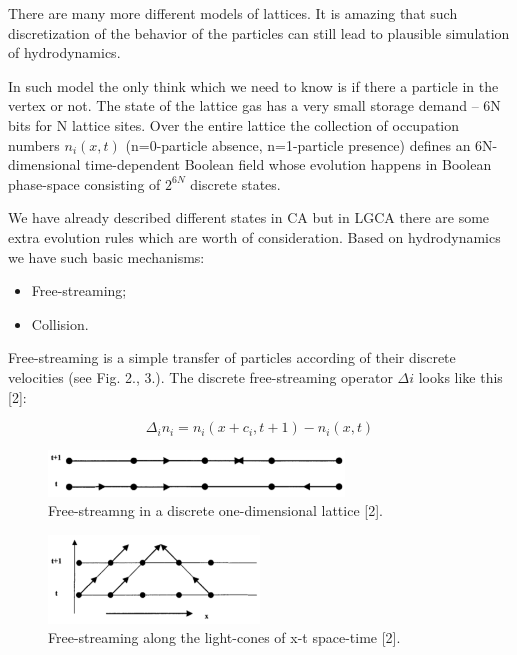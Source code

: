 There are many more different models of lattices. It is amazing that such discretization of the behavior of the particles can still lead to plausible simulation of hydrodynamics.

In such model the only think which we need to know is if there a particle in the vertex or not. The state of the lattice gas has a very small storage demand – 6N bits for N lattice sites.  Over the entire lattice the collection of occupation numbers $n_{i}(x,t)$ (n=0-particle absence, n=1-particle presence) defines an 6N-dimensional time-dependent Boolean field whose evolution happens in Boolean phase-space consisting of $2^{6N}$ discrete states.

We have already described different states in CA but in LGCA there are some extra evolution rules which are worth of consideration. Based on hydrodynamics we have such basic mechanisms:

\begin{itemize}
\item Free-streaming;
\item Collision.
\end{itemize}

Free-streaming is a simple transfer of particles according of their discrete velocities (see Fig. 2., 3.). The discrete free-streaming operator $\Delta i$ looks like this [2]:

\begin{equation}
\Delta_i n_i = n_i(x+c_{i}, t+1) - n_{i}(x,t)
\end{equation}

\begin{figure}[H]
  \centering
  \includegraphics[width=0.7\textwidth]{img/fig2.png}
  \caption{Free-streamng in a discrete one-dimensional lattice [2].}
\end{figure}

\begin{figure}[H]
  \centering
  \includegraphics[width=0.5\textwidth]{img/fig3.png}
  \caption{Free-streaming along the light-cones of x-t space-time [2].}
\end{figure}

